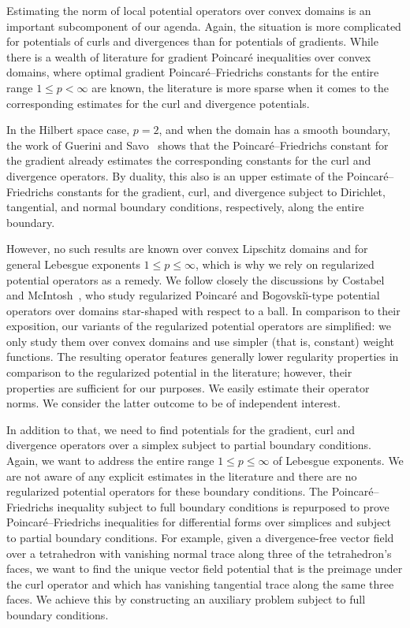 \documentclass[10pt,a4paper]{article}
\begin{document}
Estimating the norm of local potential operators over convex domains is an important subcomponent of our agenda. 
Again, the situation is more complicated for potentials of curls and divergences than for potentials of gradients.
While there is a wealth of literature for gradient Poincar\'e inequalities over convex domains, where optimal gradient Poincar\'e--Friedrichs constants for the entire range $1 \leq p < \infty$ are known,
the literature is more sparse when it comes to the corresponding estimates for the curl and divergence potentials.

In the Hilbert space case, $p=2$, and when the domain has a smooth boundary, the work of Guerini and Savo~\cite{guerini2004eigenvalue} shows that the Poincar\'e--Friedrichs constant for the gradient already estimates the corresponding constants for the curl and divergence operators. By duality, this also is an upper estimate of the Poincar\'e--Friedrichs constants for the gradient, curl, and divergence subject to Dirichlet, tangential, and normal boundary conditions, respectively, along the entire boundary. 

However, no such results are known over convex Lipschitz domains and for general Lebesgue exponents $1 \leq p \leq \infty$, which is why we rely on regularized potential operators as a remedy. 
We follow closely the discussions by Costabel and McIntosh~\cite{costabel2010bogovskiui},
who study regularized Poincar\'e and Bogovski\u{\i}-type potential operators over domains star-shaped with respect to a ball. 
In comparison to their exposition, our variants of the regularized potential operators are simplified:
we only study them over convex domains and use simpler (that is, constant) weight functions. 
The resulting operator features generally lower regularity properties in comparison to the regularized potential in the literature;
however, their properties are sufficient for our purposes. We easily estimate their operator norms. 
We consider the latter outcome to be of independent interest. 


In addition to that, we need to find potentials for the gradient, curl and divergence operators over a simplex subject to partial boundary conditions. 
Again, we want to address the entire range $1 \leq p \leq \infty$ of Lebesgue exponents. 
We are not aware of any explicit estimates in the literature and there are no regularized potential operators for these boundary conditions. 
The Poincar\'e--Friedrichs inequality subject to full boundary conditions is repurposed to prove Poincar\'e--Friedrichs inequalities for differential forms over simplices and subject to partial boundary conditions. 
For example, given a divergence-free vector field over a tetrahedron with vanishing normal trace along three of the tetrahedron's faces, 
we want to find the unique vector field potential that is the preimage under the curl operator and which has vanishing tangential trace along the same three faces. 
We achieve this by constructing an auxiliary problem subject to full boundary conditions.
\\
\end{document}
